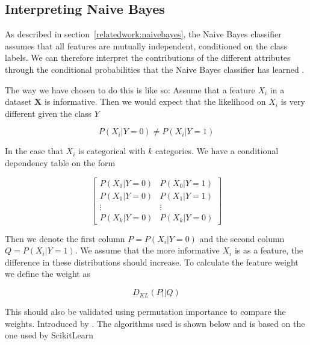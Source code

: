 \subsection{Interpreting Naive Bayes}

As described in section~\ref{relatedwork:naivebayes}, the Naive Bayes classifier assumes that all features are mutually independent, conditioned on the class labels. We can therefore interpret the contributions of the different attributes through the conditional probabilities that the Naive Bayes classifier has learned \cite[p.~142]{Molnar:2020:Book}.

The way we have chosen to do this is like so: Assume that a feature $X_i$ in a dataset $\boldsymbol{X}$ is informative. Then we would expect that the likelihood on $X_i$ is very different given the class $Y$

\begin{equation*}
    P(X_i | Y = 0) \neq P(X_i | Y = 1)
\end{equation*}

In the case that $X_i$ is categorical with $k$ categories. We have a conditional dependency table on the form

\begin{equation*}
    \begin{bmatrix}
        P(X_0 | Y = 0) & P(X_0 | Y = 1) \\ 
        P(X_1 | Y = 0) & P(X_1 | Y = 1) \\
        \vdots & \vdots \\
        P(X_k | Y = 0) & P(X_k | Y = 0)
    \end{bmatrix}
\end{equation*}

Then we denote the first column $P = P(X_i | Y = 0)$ and the second column $Q = P(X_i | Y = 1)$. We assume that the more informative $X_i$ is as a feature, the difference in these distributions should increase. To calculate the feature weight we define the weight as 

\begin{equation*}
    D_{KL}(P||Q)
\end{equation*}

This should also be validated using permutation importance to compare the weights. Introduced by \citet[p.23-25]{Breiman:2021:MachLearn}. The algorithms used is shown below and is based on the one used by ScikitLearn \cite{Pedregosa:2011:JMLR}

